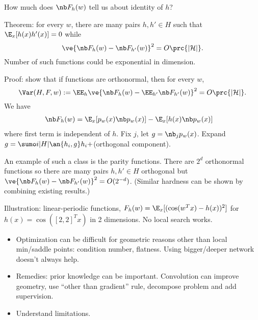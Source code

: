 How much does $\nb F_h(w)$ tell us about identity of $h$?

Theorem: for every $w$, there are many pairs $h,h'\in H$ such that $\E_x[h(x)h'(x)]=0$ while 
$$
\ve{\nb F_h(w) - \nb F_{h'}(w)}^2 = O\prc{|\cal H|}.
$$
Number of such functions could be exponential in dimension.

Proof: show that if functions are orthonormal, then for every $w$,
$$
\Var(H,F,w):=\EE_{h}\ve{\nb F_h(w) - \EE_{h'} \nb F_{h'}(w)}^2 =  O\prc{|\cal H|}.
$$
We have
\begin{align}
\nb F_h(w) &= \E_x[p_w(x)\nb p_w(x)] - \E_x [h(x) \nb p_w(x)]
\end{align}
where first term is independent of $h$.
Fix $j$, let $g= \nb_j p_w(x)$. Expand $g=\sumo i{|H|} \an{h_i,g}h_i+$(orthogonal component).

An example of such a class is the parity functions. There are $2^d$ orthonormal functions so there are many pairs $h,h'\in H$ orthogonal but $\ve{\nb F_h(w)-\nb F_{h'}(w)}^2=O(2^{-d})$. (Similar hardness can be shown by combining existing results.)

Illustration: linear-periodic functions, $F_h(w) = \E_x[(\cos(w^Tx) - h(x))^2]$ for $h(x)=\cos([2,2]^T x)$ in 2 dimensions. No local search works.

\begin{itemize}
\item
Optimization can be difficult for geometric reasons other than local min/saddle points: condition number, flatness. Using bigger/deeper network doesn't always help.
\item
Remedies: prior knowledge can be important. Convolution can improve geometry, use ``other than gradient'' rule, decompose problem and add supervision.
\item
Understand limitations.
\end{itemize}

